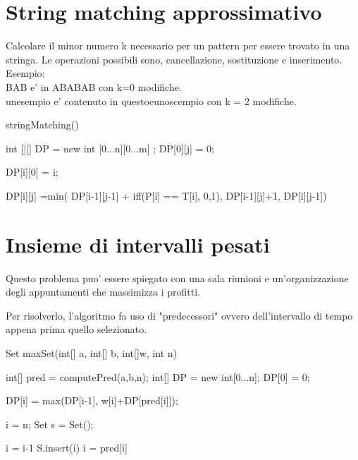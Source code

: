 \documentclass[oneside]{book}
\begin{document}
\newpage

\section{String matching approssimativo}
Calcolare il minor numero k necessario per un pattern per essere trovato in una stringa. Le operazioni possibili sono, cancellazione, sostituzione e inserimento. Esempio:\\
BAB e' in ABABAB con k=0 modifiche. \\
unesempio e' contenuto in questoeunoscempio con k = 2 modifiche.

\begin{algorithm}
\caption{stringMatching()}\label{alg:cap}
\begin{algorithmic}
\State int [][] DP = new int [0...n][0...m] ;
 DP[0][j] = 0;
\EndFor

 DP[i][0] = i;
\EndFor

		\State DP[i][j] =min( \State DP[i-1][j-1] + iff(P[i] == T[i], 0,1),
	\State        DP[i-1][j]+1,
	\State        DP[i][j-1])
	\EndFor

\EndFor
\end{algorithmic}
\end{algorithm}
\newpage
\section{Insieme di intervalli pesati}
Questo problema puo' essere spiegato con una sala riunioni e un'organizzazione degli appuntamenti che massimizza i profitti.

Per risolverlo, l'algoritmo fa uso di "predecessori" ovvero dell'intervallo di tempo appena prima quello selezionato.

\begin{algorithm}
\caption{Set maxSet(int[] a, int[] b, int[]w, int n)\label{alg:cap}}
\begin{algorithmic}

\State int[] pred = computePred(a,b,n);
\State int[] DP = new int[0...n];
\State DP[0] = 0;
	\item DP[i] = max(DP[i-1], w[i]+DP[pred[i]]);
\EndFor

\State i = n;
\State Set s = Set();


		\State i = i-1
	\Else
		S.insert(i)
		i = pred[i]
	\EndIf
\EndWhile

\end{algorithmic}
\end{algorithm}
\end{document}
